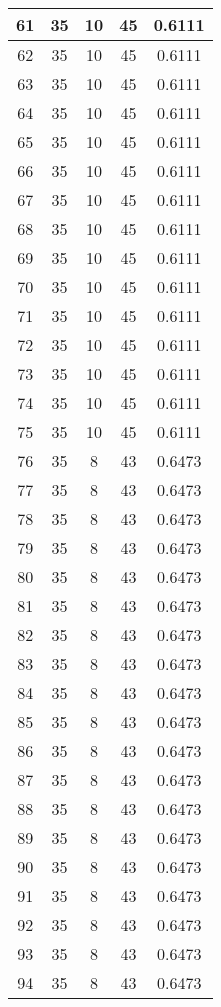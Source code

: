 \documentclass[letterpaper, 12pt]{article}
\begin{document}
\begin{longtable}{|c|c|c|c|c|}
\hline
61 & 35 & 10 & 45 & 0.6111 \\
\hline
62 & 35 & 10 & 45 & 0.6111 \\
\hline
63 & 35 & 10 & 45 & 0.6111 \\
\hline
64 & 35 & 10 & 45 & 0.6111 \\
\hline
65 & 35 & 10 & 45 & 0.6111 \\
\hline
66 & 35 & 10 & 45 & 0.6111 \\
\hline
67 & 35 & 10 & 45 & 0.6111 \\
\hline
68 & 35 & 10 & 45 & 0.6111 \\
\hline
69 & 35 & 10 & 45 & 0.6111 \\
\hline
70 & 35 & 10 & 45 & 0.6111 \\
\hline
71 & 35 & 10 & 45 & 0.6111 \\
\hline
72 & 35 & 10 & 45 & 0.6111 \\
\hline
73 & 35 & 10 & 45 & 0.6111 \\
\hline
74 & 35 & 10 & 45 & 0.6111 \\
\hline
75 & 35 & 10 & 45 & 0.6111 \\
\hline
76 & 35 & 8 & 43 & 0.6473 \\
\hline
77 & 35 & 8 & 43 & 0.6473 \\
\hline
78 & 35 & 8 & 43 & 0.6473 \\
\hline
79 & 35 & 8 & 43 & 0.6473 \\
\hline
80 & 35 & 8 & 43 & 0.6473 \\
\hline
81 & 35 & 8 & 43 & 0.6473 \\
\hline
82 & 35 & 8 & 43 & 0.6473 \\
\hline
83 & 35 & 8 & 43 & 0.6473 \\
\hline
84 & 35 & 8 & 43 & 0.6473 \\
\hline
85 & 35 & 8 & 43 & 0.6473 \\
\hline
86 & 35 & 8 & 43 & 0.6473 \\
\hline
87 & 35 & 8 & 43 & 0.6473 \\
\hline
88 & 35 & 8 & 43 & 0.6473 \\
\hline
89 & 35 & 8 & 43 & 0.6473 \\
\hline
90 & 35 & 8 & 43 & 0.6473 \\
\hline
91 & 35 & 8 & 43 & 0.6473 \\
\hline
92 & 35 & 8 & 43 & 0.6473 \\
\hline
93 & 35 & 8 & 43 & 0.6473 \\
\hline
94 & 35 & 8 & 43 & 0.6473 \\
\hline

\end{longtable}
\end{document}
